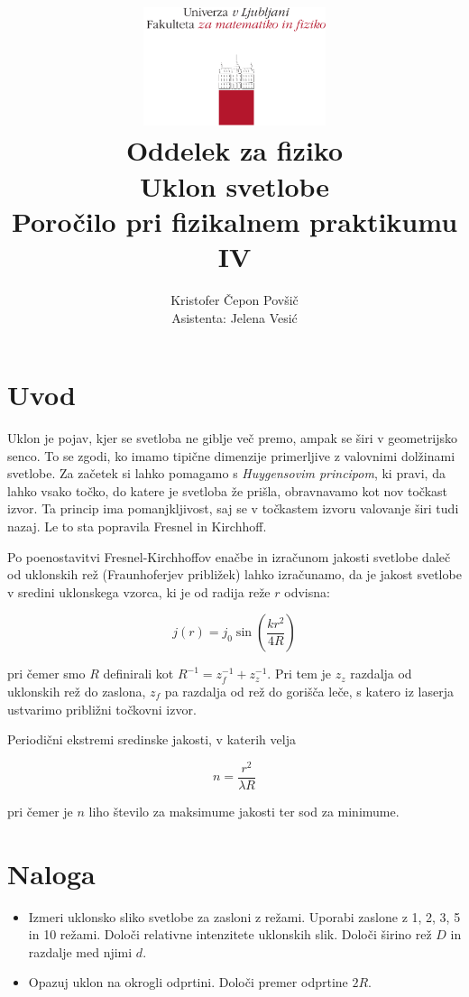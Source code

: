 \documentclass[12pt]{report}
\title{
  \includegraphics[width=0.4\textwidth]{fmf_logo}\\
  {\small Oddelek za fiziko} \\
  {Uklon svetlobe}\\
  {\small Poročilo pri fizikalnem praktikumu IV}\\

}
\date{}
\author{Kristofer Čepon Povšič\\[5 cm]
 \small  Asistenta: Jelena Vesić  \\
}
\begin{document}
\setcounter{page}{2}

\maketitle

\chapter*{Uvod}

Uklon je pojav, kjer se svetloba ne giblje več premo, ampak se širi v geometrijsko senco. To se zgodi, ko imamo tipične dimenzije primerljive z valovnimi dolžinami svetlobe. Za začetek si lahko pomagamo s \emph{Huygensovim principom}, ki pravi, da lahko vsako točko, do katere je svetloba že prišla, obravnavamo kot nov točkast izvor. Ta princip ima pomanjkljivost, saj se v točkastem izvoru valovanje širi tudi nazaj. Le to sta popravila Fresnel in Kirchhoff. 

Po poenostavitvi Fresnel-Kirchhoffov enačbe in izračunom jakosti svetlobe daleč od uklonskih rež (Fraunhoferjev približek) lahko izračunamo, da je jakost svetlobe v sredini uklonskega vzorca, ki je od radija reže $r$ odvisna: 

\begin{equation}
  j(r) = j_0 \sin \left(\frac{kr^2}{4R}\right)
\end{equation}

pri čemer smo $R$ definirali kot $R^{-1} = z_f^{-1} + z_z^{-1}$. Pri tem je $z_z$ razdalja od uklonskih rež do zaslona, $z_f$ pa razdalja od rež do gorišča leče, s katero iz laserja ustvarimo približni točkovni izvor. 

Periodični ekstremi sredinske jakosti, v katerih velja 

\begin{equation}
  n = \frac{r^2}{\lambda R}
\end{equation}

pri čemer je $n$ liho število za maksimume jakosti ter sod za minimume. 

\chapter*{Naloga}

\begin{itemize}
  \item Izmeri uklonsko sliko svetlobe za zasloni z režami. Uporabi zaslone z 1, 2, 3, 5 in 10 režami. Določi relativne intenzitete uklonskih slik. Določi širino rež $D$ in razdalje med njimi $d$. 
  \item Opazuj uklon na okrogli odprtini. Določi premer odprtine $2R$.
\end{itemize} 
\end{document}
